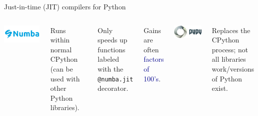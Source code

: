 \documentclass[aspectratio=169]{beamer}
\begin{document}
\begin{frame}{Just-in-time (JIT) compilers for Python}
\large

\begin{columns}
\begin{center}
\includegraphics[width=0.75\linewidth]{numba-logo.png}
\end{center}

Runs within normal CPython (can be used with other Python libraries).

\vspace{0.2 cm}

Only speeds up functions labeled with the \texttt{@numba.jit} decorator.

\vspace{0.2 cm}


\vspace{0.2 cm}

Gains are often \textcolor{darkblue}{factors of 100's}.

\begin{center}
\includegraphics[width=0.75\linewidth]{pypy-logo.jpg}
\end{center}

Replaces the CPython process; not all libraries work/versions of Python exist.


\end{columns}
\end{frame}
\end{document}
